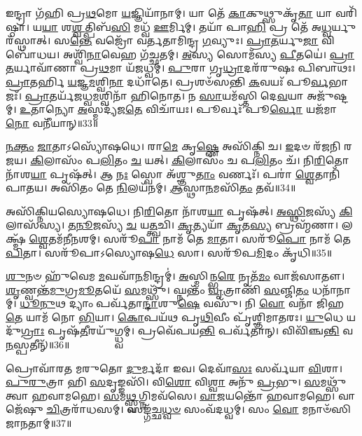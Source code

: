 𑌇𑌨𑍍𑌦𑍍𑌰𑌾 𑌗᳴𑌹𑌿 𑌪𑍍𑌰\-\ul{𑌥}\-𑌮𑍋 \ul{𑌯}\-𑌜𑍍𑌞𑌿𑌯𑌾᳴𑌨𑌾𑌮𑍍।
𑌯𑌾 𑌤𑍇᳴ \ul{𑌕𑌾}\-𑌕𑍁𑌥𑍍𑌸𑍁𑌕𑍃᳴\-\ul{𑌤𑌾} 𑌯𑌾 𑌵𑌰𑌿᳴𑌷𑍍𑌠𑌾।
𑌯\-\ul{𑌯𑌾} 𑌶\-\ul{𑌶𑍍𑌵}\-𑌤𑍍𑌪𑌿𑌬᳴\-\ul{𑌸𑌿} 𑌮𑌧𑍍𑌵᳴ \ul{𑌊}\-𑌰𑍍𑌮𑌿𑌮𑍍।
𑌤𑌯𑌾᳴ 𑌪𑌾\-\ul{𑌹𑌿} 𑌪𑍍𑌰 𑌤𑍇᳴ 𑌅\-\ul{𑌧𑍍𑌵}\-𑌰𑍍𑌯𑍁𑌰᳴𑌸𑍍𑌥𑌾𑌤𑍍।
𑌸\-\ul{𑌨𑍍𑌤𑍇} 𑌵𑌜𑍍𑌰𑍋᳴ 𑌵𑌰𑍍𑌤𑌤𑌾𑌮𑌿𑌨𑍍𑌦𑍍𑌰 \ul{𑌗}\-𑌵𑍍𑌯𑍁𑌃।
\-\ul{𑌪𑍍𑌰𑌾}\-\-\ul{𑌤}\-𑌰𑍍𑌯𑍁\-\ul{𑌜𑌾} 𑌵𑌿 𑌬𑍋᳴𑌧𑌯।
𑌅𑌶𑍍𑌵𑌿᳴\-\ul{𑌨𑌾}\-𑌵𑍇𑌹 𑌗᳴𑌚𑍍𑌛𑌤𑌮𑍍।
\-\ul{𑌅}\-𑌸𑍍𑌯 𑌸𑍋𑌮᳴𑌸𑍍𑌯 \ul{𑌪𑍀}\-𑌤𑌯𑍇॑।
\-\ul{𑌪𑍍𑌰𑌾}\-\-\ul{𑌤}\-𑌰𑍍𑌯𑌾𑌵𑌾᳴𑌣𑌾 𑌪𑍍𑌰\-\ul{𑌥}\-𑌮𑌾 𑌯᳴𑌜𑌧𑍍𑌵𑌮𑍍।
\-\ul{𑌪𑍁}\-𑌰𑌾 𑌗𑍃\-\ul{𑌧𑍍𑌰𑌾}\-𑌦𑌰᳴𑌰𑍁𑌷𑌃 𑌪𑌿𑌬𑌾𑌥𑌃।
\-\ul{𑌪𑍍𑌰𑌾}\-𑌤𑌰𑍍\mbox{}𑌹𑌿 \ul{𑌯}\-𑌜𑍍𑌞\-\ul{𑌮}\-𑌶𑍍𑌵𑌿\-\ul{𑌨𑌾} 𑌦𑌧𑌾᳴𑌤𑍇।
𑌪𑍍𑌰𑌶𑍞᳴𑌸𑌨𑍍𑌤𑌿 \ul{𑌕}\-𑌵𑌯𑌃᳴ 𑌪𑍂\-\ul{𑌰𑍍𑌵}\-𑌭𑌾𑌜𑌃᳴।
\-\ul{𑌪𑍍𑌰𑌾}\-𑌤𑌰𑍍𑌯᳴𑌜𑌧𑍍𑌵\-\ul{𑌮}\-𑌶𑍍𑌵𑌿𑌨𑌾᳴ 𑌹𑌿𑌨𑍋𑌤।
𑌨 \ul{𑌸𑌾}\-𑌯𑌮᳴𑌸𑍍𑌤𑌿 𑌦𑍇\-\ul{𑌵}\-𑌯𑌾 𑌅𑌜𑍁᳴𑌷𑍍𑌟𑌮𑍍।
\-\ul{𑌉}\-𑌤𑌾𑌨𑍍𑌯𑍋 \ul{𑌅}\-𑌸𑍍𑌮𑌦𑍍𑌯᳴𑌜\-\ul{𑌤𑍇} 𑌵𑌿𑌚𑌾᳴𑌯𑌃।
𑌪𑍂𑌰𑍍𑌵𑌃᳴ 𑌪𑍂\-\ul{𑌰𑍍𑌵𑍋} 𑌯𑌜᳴𑌮𑌾\-\ul{𑌨𑍋} 𑌵𑌨𑍀᳴𑌯𑌾𑌨𑍍॥33॥\anuvakamend[\-\ul{𑌚𑌾}\-\-\ul{𑌶𑍍𑌵}\-𑌜𑌿𑌦𑍍𑌯𑍋 𑌗᳴𑌚𑍍𑌛𑌤𑌂 \ul{𑌨𑍋} 𑌦𑌾\-\ul{𑌶}\-𑌨𑍍𑌨𑌾𑌮𑌾᳴\-\ul{𑌭𑌿}\-𑌶𑍍𑌰𑍀𑌰𑍍𑌗᳴𑌮𑍇𑌮 \ul{𑌸}\-𑌪𑍍𑌰𑌥𑌾᳴ 𑌭𑌜𑌾𑌮𑌹𑍇 𑌵𑌿𑌶𑌨𑍍𑌤𑍁 \ul{𑌯𑌾}\-𑌹𑍍𑌯᳴𑌰𑍍𑌵𑌾𑌙𑌚𑍍𑌛᳴ 𑌪𑌿𑌬𑌾\-\ul{𑌥𑌃} 𑌷𑌟𑍍𑌚᳴]

\-\ul{𑌨}\-\-\ul{𑌕𑍍𑌤𑌂} \ul{𑌜𑌾}\-𑌤𑌾\-𑌽𑌸𑍍𑌯𑍋᳴𑌷𑌧𑍇।
𑌰𑌾\-\ul{𑌮𑍇} 𑌕𑍃\-\ul{𑌷𑍍𑌣𑍇} 𑌅𑌸𑌿᳴𑌕𑍍𑌨𑌿 𑌚।
\-\ul{𑌇}\-𑌦𑍞 𑌰᳴𑌜𑌨𑌿 𑌰𑌜𑌯।
\-\ul{𑌕𑌿}\-𑌲𑌾𑌸𑌂᳴ 𑌪\-\ul{𑌲𑌿}\-𑌤𑌂 \ul{𑌚} 𑌯𑌤𑍍।
\-\ul{𑌕𑌿}\-𑌲𑌾𑌸𑌂᳴ 𑌚 𑌪\-\ul{𑌲𑌿}\-𑌤𑌂 𑌚᳴।
𑌨𑌿\-\ul{𑌰𑌿}\-𑌤𑍋 𑌨𑌾᳴𑌶\-\ul{𑌯𑌾} 𑌪𑍃𑌷᳴𑌤𑍍।
𑌆 \ul{𑌨𑌃} 𑌸𑍍𑌵𑍋 𑌅᳴𑌶𑍍𑌞𑍁\-\ul{𑌤𑌾𑌂} 𑌵𑌰𑍍𑌣𑌃᳴।
𑌪𑌰𑌾॑ \ul{𑌶𑍍𑌵𑍇}\-𑌤𑌾𑌨𑌿᳴ 𑌪𑌾𑌤𑌯।
𑌅𑌸𑌿᳴𑌤𑌂 𑌤𑍇 \ul{𑌨𑌿}\-𑌲𑌯᳴𑌨𑌮𑍍।
\-\ul{𑌆}\-𑌸𑍍𑌥𑌾\-\ul{𑌨}\-𑌮𑌸𑌿᳴\-\ul{𑌤𑌂} 𑌤𑌵᳴॥34॥

𑌅𑌸𑌿᳴𑌕𑍍𑌨𑌿𑌯𑌸𑍍𑌯𑍋𑌷𑌧𑍇।
𑌨𑌿\-\ul{𑌰𑌿}\-𑌤𑍋 𑌨𑌾᳴𑌶\-\ul{𑌯𑌾} 𑌪𑍃𑌷᳴𑌤𑍍।
\-\ul{𑌅}\-\-\ul{𑌸𑍍𑌥𑌿}\-𑌜𑌸𑍍𑌯᳴ \ul{𑌕𑌿}\-𑌲𑌾𑌸᳴𑌸𑍍𑌯।
\-\ul{𑌤}\-\-\ul{𑌨𑍂}\-𑌜𑌸𑍍𑌯᳴ \ul{𑌚} 𑌯\-\ul{𑌤𑍍𑌤𑍍𑌵}\-𑌚𑌿।
\-\ul{𑌕𑍃}\-𑌤𑍍𑌯𑌯𑌾᳴ \ul{𑌕𑍃}\-𑌤\-\ul{𑌸𑍍𑌯} 𑌬𑍍𑌰𑌹𑍍𑌮᳴𑌣𑌾।
𑌲𑌕𑍍𑌷𑍍𑌮᳴ \ul{𑌶𑍍𑌵𑍇}\-𑌤𑌮᳴𑌨𑍀𑌨𑌶𑌮𑍍।
𑌸𑌰𑍂᳴\-\ul{𑌪𑌾} 𑌨𑌾𑌮᳴ 𑌤𑍇 \ul{𑌮𑌾}\-𑌤𑌾।
𑌸𑌰𑍂᳴\-\ul{𑌪𑍋} 𑌨𑌾𑌮᳴ 𑌤𑍇 \ul{𑌪𑌿}\-𑌤𑌾।
𑌸𑌰𑍂᳴𑌪𑌾\-𑌽𑌸𑍍𑌯𑍋𑌷\-\ul{𑌧𑍇} 𑌸𑌾।
𑌸𑌰𑍂᳴𑌪\-\ul{𑌮𑌿}\-𑌦𑌂 𑌕𑍃᳴𑌧𑌿॥35॥

\-\ul{𑌶𑍁}\-𑌨𑍞 𑌹𑍁᳴𑌵𑍇𑌮 \ul{𑌮}\-𑌘𑌵𑌾᳴\-\ul{𑌨}\-𑌮𑌿𑌨𑍍𑌦𑍍𑌰𑌮𑍍॑।
\-\ul{𑌅}\-𑌸𑍍𑌮𑌿𑌨𑍍𑌭\-\ul{𑌰𑍇} 𑌨𑍃𑌤᳴\-\ul{𑌮𑌂} 𑌵𑌾𑌜᳴𑌸𑌾𑌤𑍗।
\-\ul{𑌶𑍃}\-𑌣𑍍𑌵𑌨𑍍𑌤᳴\-\ul{𑌮𑍁}\-𑌗𑍍𑌰\-\ul{𑌮𑍂}\-𑌤𑌯𑍇᳴ \ul{𑌸}\-𑌮𑌥𑍍𑌸𑍁᳴।
𑌘𑍍𑌨𑌨𑍍𑌤𑌂᳴ \ul{𑌵𑍃}\-𑌤𑍍𑌰𑌾𑌣𑌿᳴ \ul{𑌸}\-𑌞𑍍𑌜𑌿\-\ul{𑌤𑌂} 𑌧𑌨𑌾᳴𑌨𑌾𑌮𑍍।
\-\ul{𑌧𑍂}\-\-\ul{𑌨𑍁}\-𑌥 𑌦𑍍𑌯𑌾𑌂 𑌪𑌰𑍍𑌵᳴𑌤𑌾\-\ul{𑌨𑍍𑌦𑌾}\-𑌶𑍁\-\ul{𑌷𑍇} 𑌵𑌸𑍁᳴।
𑌨𑌿 \ul{𑌵𑍋} 𑌵𑌨𑌾᳴ 𑌜𑌿𑌹\-\ul{𑌤𑍇} 𑌯𑌾𑌮᳴ 𑌨𑍋 \ul{𑌭𑌿}\-𑌯𑌾।
\-\ul{𑌕𑍋}\-𑌪𑌯᳴𑌥 𑌪𑍃\-\ul{𑌥𑌿}\-𑌵𑍀𑌂 𑌪𑍃᳴𑌶𑍍𑌞𑌿𑌮𑌾𑌤𑌰𑌃।
\-\ul{𑌯𑍁}\-𑌧𑍇 𑌯𑌦𑍁᳴\-\ul{𑌗𑍍𑌰𑌾𑌃} 𑌪𑍃𑌷᳴\-\ul{𑌤𑍀}\-𑌰𑌯𑍁᳴𑌗𑍍𑌧𑍍𑌵𑌮𑍍।
𑌪𑍍𑌰𑌵𑍇᳴𑌪𑌯\-\ul{𑌨𑍍𑌤𑌿} 𑌪𑌰𑍍𑌵᳴𑌤𑌾𑌨𑍍।
𑌵𑌿𑌵𑌿᳴𑌞𑍍𑌚\-\ul{𑌨𑍍𑌤𑌿} 𑌵\-\ul{𑌨}\-𑌸𑍍𑌪𑌤𑍀𑌨𑍍᳴॥36॥

𑌪𑍍𑌰𑍋𑌵𑌾᳴𑌰𑌤 𑌮𑌰𑍁𑌤𑍋 \ul{𑌦𑍁}\-𑌰𑍍𑌮𑌦𑌾᳴ 𑌇𑌵।
𑌦𑍇𑌵𑌾᳴\-\ul{𑌸𑌃} 𑌸𑌰𑍍𑌵᳴𑌯𑌾 \ul{𑌵𑌿}\-𑌶𑌾।
\-\ul{𑌪𑍁}\-\-\ul{𑌰𑍁}\-𑌤𑍍𑌰𑌾 𑌹𑌿 \ul{𑌸}\-𑌦𑍃𑌙𑍍𑌙𑌸𑌿᳴।
𑌵𑌿\-\ul{𑌶𑍋} 𑌵𑌿\-\ul{𑌶𑍍𑌵𑌾} 𑌅𑌨𑍁᳴ \ul{𑌪𑍍𑌰}\-𑌭𑍁।
\-\ul{𑌸}\-𑌮𑌥𑍍𑌸𑍁᳴ 𑌤𑍍𑌵𑌾 𑌹𑌵𑌾𑌮𑌹𑍇।
\-\ul{𑌸}\-𑌮\-\ul{𑌥𑍍𑌸𑍍𑌵}\-𑌗𑍍𑌨𑌿𑌮𑌵᳴𑌸𑍇।
\-\ul{𑌵𑌾}\-\-\ul{𑌜}\-𑌯𑌨𑍍𑌤𑍋᳴ 𑌹𑌵𑌾𑌮𑌹𑍇।
𑌵𑌾𑌜𑍇᳴𑌷𑍁 \ul{𑌚𑌿}\-𑌤𑍍𑌰𑌰𑌾᳴𑌧𑌸𑌮𑍍।
𑌸𑌙𑍍𑌗᳴𑌚𑍍𑌛\-\ul{𑌧𑍍𑌵}\-\-\ul{𑍞} 𑌸𑌂𑌵᳴𑌦𑌧𑍍𑌵𑌮𑍍।
𑌸𑌂 \ul{𑌵𑍋} 𑌮𑌨𑌾𑍞᳴𑌸𑌿 𑌜𑌾𑌨𑌤𑌾𑌮𑍍॥37॥

